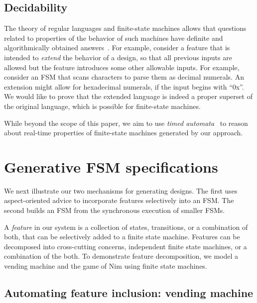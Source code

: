 \documentclass[sigplan,anonymous,review]{acmart}
\begin{document}
\subsection{Decidability}\label{sec:decide}

The theory of regular languages and finite-state machines allows that questions related to properties of the behavior of such machines have definite and algorithmically obtained answers~\cite{sipser}. For example, consider a feature that is intended to \emph{extend} the behavior of a design, so that all previous inputs are allowed but the feature introduces some other allowable inputs. For example, consider an FSM that scans characters to parse them as decimal numerals.  An extension might allow for hexadecimal numerals, if the input begins with ``0x''.  We would like to prove that the extended language is indeed a proper superset of the original language, which is possible for finite-state machines.

While beyond the scope of this paper, we aim to use \emph{timed automata}~\cite{10.1145/2518102} to reason about real-time properties of finite-state machines generated by our approach.

\section{Generative FSM specifications}

We next illustrate our two mechanisms for generating designs.  The first uses aspect-oriented advice to incorporate features selectively into an FSM.  The second builds an FSM from the synchronous execution of smaller FSMs.

 A \emph{feature} in our system is a collection of states, transitions, or a combination of both, that can be selectively added to a finite state machine. Features can be decomposed into cross-cutting concerns, independent finite state machines, or a combination of the both. To demonstrate feature decomposition, we model a vending machine and the game of Nim using finite state machines.

\subsection{Automating feature inclusion: vending machine}\label{sec:vend}
\end{document}
